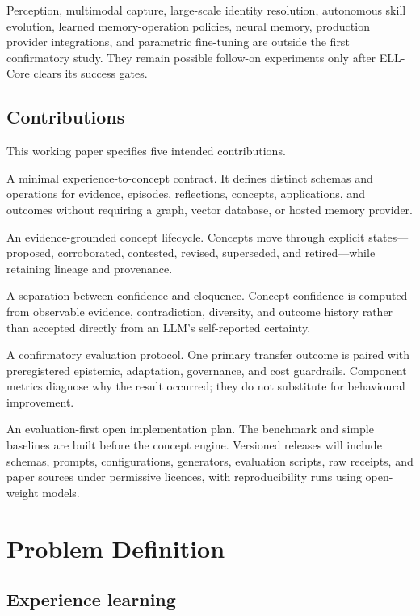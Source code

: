 \documentclass[
  english,
  a4paper,
  DIV=11,
  numbers=noendperiod]{scrreprt}
\begin{document}
Perception, multimodal capture, large-scale identity resolution,
autonomous skill evolution, learned memory-operation policies, neural
memory, production provider integrations, and parametric fine-tuning are
outside the first confirmatory study. They remain possible follow-on
experiments only after ELL-Core clears its success gates.

\section{Contributions}\label{contributions}

This working paper specifies five intended contributions.

A minimal experience-to-concept contract. It defines distinct schemas
and operations for evidence, episodes, reflections, concepts,
applications, and outcomes without requiring a graph, vector database,
or hosted memory provider.

An evidence-grounded concept lifecycle. Concepts move through explicit
states---proposed, corroborated, contested, revised, superseded, and
retired---while retaining lineage and provenance.

A separation between confidence and eloquence. Concept confidence is
computed from observable evidence, contradiction, diversity, and outcome
history rather than accepted directly from an LLM's self-reported
certainty.

A confirmatory evaluation protocol. One primary transfer outcome is
paired with preregistered epistemic, adaptation, governance, and cost
guardrails. Component metrics diagnose why the result occurred; they do
not substitute for behavioural improvement.

An evaluation-first open implementation plan. The benchmark and simple
baselines are built before the concept engine. Versioned releases will
include schemas, prompts, configurations, generators, evaluation
scripts, raw receipts, and paper sources under permissive licences, with
reproducibility runs using open-weight models.


\chapter{Problem Definition}\label{problem-definition}

\section{Experience learning}\label{experience-learning}
\end{document}
